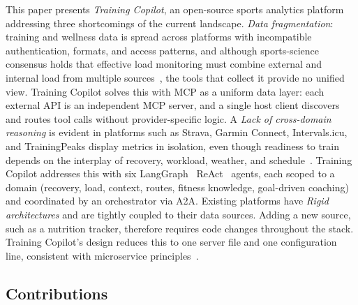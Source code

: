 This paper presents \textit{Training Copilot}, an open-source sports analytics platform addressing three shortcomings of the current landscape. \textit{Data fragmentation}: training and wellness data is spread across platforms with incompatible authentication, formats, and access patterns, and although sports-science consensus holds that effective load monitoring must combine external and internal load from multiple sources~\citep{bourdon_monitoring_2017, halson_monitoring_2014}, the tools that collect it provide no unified view. Training Copilot solves this with MCP as a uniform data layer: each external API is an independent MCP server, and a single host client discovers and routes tool calls without provider-specific logic. A \textit{Lack of cross-domain reasoning} is evident in platforms such as Strava, Garmin Connect, Intervals.icu, and TrainingPeaks display metrics in isolation, even though readiness to train depends on the interplay of recovery, workload, weather, and schedule~\citep{bourdon_monitoring_2017, gabbett_training_2016}. Training Copilot addresses this with six LangGraph~\citep{langchain_langgraph_2024} ReAct~\citep{yao_react_2023} agents, each scoped to a domain (recovery, load, context, routes, fitness knowledge, goal-driven coaching) and coordinated by an orchestrator via A2A. Existing platforms have \textit{Rigid architectures} and are tightly coupled to their data sources. Adding a new source, such as a nutrition tracker, therefore requires code changes throughout the stack. Training Copilot's design reduces this to one server file and one configuration line, consistent with microservice principles~\citep{dragoni_microservices_2017}.  

\subsection{Contributions}\label{sec:intro:contributions}

